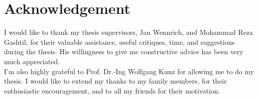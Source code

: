 \documentclass[a4paper,11pt]{report}
\begin{document}
\cleardoublepage

\section*{Acknowledgement}
\text I would like to thank my thesis supervisors, Jan Wennrich, and Mohammad Reza Gashtil, for their valuable assistance, useful critiques, time, and suggestions during the thesis.
His willingness to give me constructive advice has been very much appreciated.
\\
I’m also highly grateful to Prof.
Dr.-Ing Wolfgang Kunz for allowing me to do my thesis.
I would like to extend my thanks to my family members,
for their enthusiastic encouragement, and to all my
friends for their motivation.

\cleardoublepage

\tableofcontents










\listoffigures
{}
\listoftables
{}
\lstlistoflistings

\glsaddall

\printnoidxglossary[type=\acronymtype,style=long,
    title=List of Abbreviations,nonumberlist]



\end{document}
